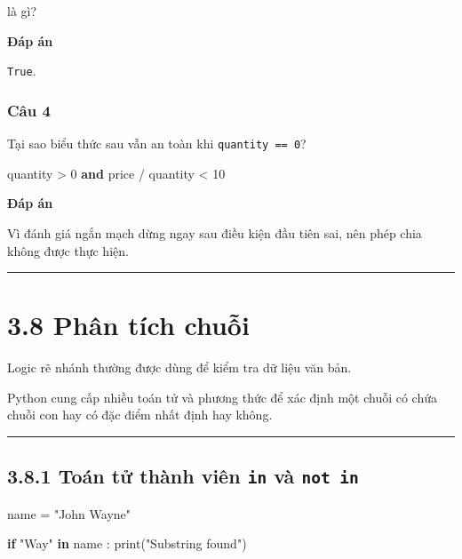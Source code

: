 \documentclass[
  11pt,
  a4paper,
]{article}
\newenvironment{Shaded}{}{}
\newcommand{\BuiltInTok}[1]{\textcolor[rgb]{0.00,0.50,0.00}{#1}}
\newcommand{\ControlFlowTok}[1]{\textcolor[rgb]{0.00,0.44,0.13}{\textbf{#1}}}
\newcommand{\DecValTok}[1]{\textcolor[rgb]{0.25,0.63,0.44}{#1}}
\newcommand{\KeywordTok}[1]{\textcolor[rgb]{0.00,0.44,0.13}{\textbf{#1}}}
\newcommand{\NormalTok}[1]{#1}
\newcommand{\OperatorTok}[1]{\textcolor[rgb]{0.40,0.40,0.40}{#1}}
\newcommand{\StringTok}[1]{\textcolor[rgb]{0.25,0.44,0.63}{#1}}
\begin{document}
là gì?

\textbf{Đáp án}

\texttt{True}.

\subsubsection{Câu 4}\label{cuxe2u-4-2}

Tại sao biểu thức sau vẫn an toàn khi \texttt{quantity\ ==\ 0}?

\begin{Shaded}
\begin{Highlighting}[]
\NormalTok{quantity }\OperatorTok{\textgreater{}} \DecValTok{0} \KeywordTok{and}\NormalTok{ price }\OperatorTok{/}\NormalTok{ quantity }\OperatorTok{\textless{}} \DecValTok{10}
\end{Highlighting}
\end{Shaded}

\textbf{Đáp án}

Vì đánh giá ngắn mạch dừng ngay sau điều kiện đầu tiên sai, nên phép
chia không được thực hiện.

\begin{center}\rule{0.5\linewidth}{0.5pt}\end{center}

\section{3.8 Phân tích chuỗi}\label{phuxe2n-tuxedch-chuux1ed7i}

Logic rẽ nhánh thường được dùng để kiểm tra dữ liệu văn bản.

Python cung cấp nhiều toán tử và phương thức để xác định một chuỗi có
chứa chuỗi con hay có đặc điểm nhất định hay không.

\begin{center}\rule{0.5\linewidth}{0.5pt}\end{center}

\subsection{\texorpdfstring{3.8.1 Toán tử thành viên \texttt{in} và
\texttt{not\ in}}{3.8.1 Toán tử thành viên in và not in}}\label{touxe1n-tux1eed-thuxe0nh-viuxean-in-vuxe0-not-in}

\begin{Shaded}
\begin{Highlighting}[]
\NormalTok{name }\OperatorTok{=} \StringTok{"John Wayne"}

\ControlFlowTok{if} \StringTok{"Way"} \KeywordTok{in}\NormalTok{ name :}
    \BuiltInTok{print}\NormalTok{(}\StringTok{"Substring found"}\NormalTok{)}
\end{Highlighting}
\end{Shaded}
\end{document}
